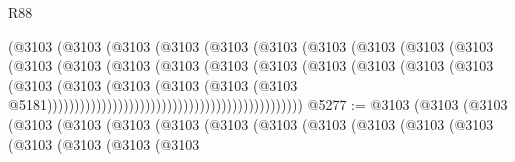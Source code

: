 \begin{lexlean}{R88}
\begin{coremodule}
                                              (@3103
                                                (@3103
                                                  (@3103
                                                    (@3103
                                                      (@3103
                                                        (@3103
                                                          (@3103
                                                            (@3103
                                                              (@3103
                                                                (@3103
                                                                  (@3103
                                                                    (@3103
                                                                      (@3103
                                                                        (@3103
                                                                          (@3103
                                                                            (@3103
                                                                              (@3103
                                                                                (@3103
                                                                                  (@3103
                                                                                    (@3103
                                                                                      (@3103
                                                                                        (@3103
                                                                                          (@3103
                                                                                            (@3103
                                                                                              (@3103
                                                                                                (@3103
                                                                                                  @5181)))))))))))))))))))))))))))))))))))))))))))))))
@5277 := @3103
    (@3103
      (@3103
        (@3103
          (@3103
            (@3103
              (@3103
                (@3103
                  (@3103
                    (@3103
                      (@3103
                        (@3103
                          (@3103
                            (@3103
                              (@3103
                                (@3103
                                  (@3103

\end{coremodule}
\end{lexlean}
